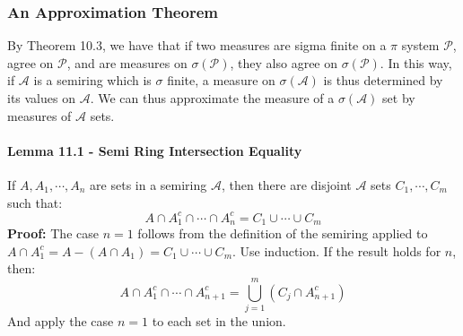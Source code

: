 \documentclass[12pt,a4paper]{article}
\newcommand{\1}[1]{\mathbbm{1}\left\{ #1 \right\}}
\newcommand{\acal}{\mathcal{A}}
\newcommand{\pcal}{\mathcal{P}}
\begin{document}
\subsubsection{An Approximation Theorem}
By Theorem 10.3, we have that if two measures are sigma finite on a $\pi$ system $\pcal$, agree on $\pcal$, and are measures on $\sigma(\pcal)$, they also agree on $\sigma(\pcal)$. In this way, if $\acal$ is a semiring which is $\sigma$ finite, a measure on $\sigma(\acal)$ is thus determined by its values on $\acal$. We can thus approximate the measure of a $\sigma(\acal)$ set by measures of $\acal$ sets.

\paragraph{Lemma 11.1 - Semi Ring Intersection Equality} If $A, A_1, \cdots, A_n$ are sets in a semiring $\acal$, then there are disjoint $\acal$ sets $C_1, \cdots, C_m$ such that:
$$
	A \cap A_1^c \cap \cdots \cap A_n^c = C_1 \cup \cdots \cup C_m
$$
\textbf{Proof:} The case $n = 1$ follows from the definition of the semiring applied to $A \cap A_1^c = A - (A \cap A_1) = C_1 \cup \cdots \cup C_m$. Use induction. If the result holds for $n$, then:
$$
	A \cap A_1^c \cap \cdots \cap A_{n+1}^c = 
	\bigcup_{j=1}^m (C_j \cap A_{n+1}^c)
$$
And apply the case $n = 1$ to each set in the union.
\end{document}
